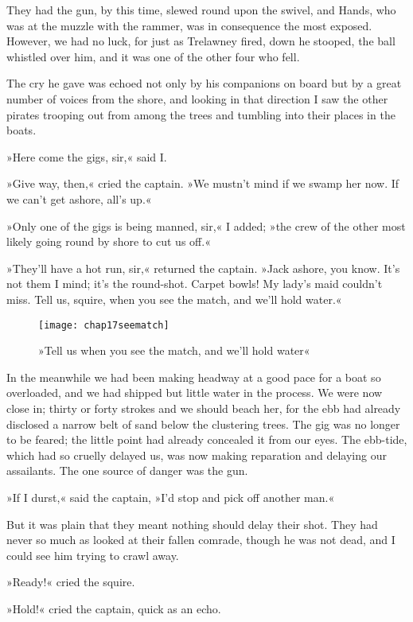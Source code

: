 They had the gun, by this time, slewed round upon the swivel, and Hands, who was at the muzzle with the rammer, was in consequence the most exposed. However, we had no luck, for just as Trelawney fired, down he stooped, the ball whistled over him, and it was one of the other four who fell.

The cry he gave was echoed not only by his companions on board but by a great number of voices from the shore, and looking in that direction I saw the other pirates trooping out from among the trees and tumbling into their places in the boats.

»Here come the gigs, sir,« said I.

»Give way, then,« cried the captain. »We mustn't mind if we swamp her now. If we can't get ashore, all's up.«

»Only one of the gigs is being manned, sir,« I added; »the crew of the other most likely going round by shore to cut us off.«

»They'll have a hot run, sir,« returned the captain. »Jack ashore, you know. It's not them I mind; it's the round-shot. Carpet bowls! My lady's maid couldn't miss. Tell us, squire, when you see the match, and we'll hold water.«


  \begin{figure}[p]
\centering
\texttt{[image: chap17seematch]}
\caption{»Tell us when you see the match, and we'll hold water«}
\end{figure} 

In the meanwhile we had been making headway at a good pace for a boat so overloaded, and we had shipped but little water in the process. We were now close in; thirty or forty strokes and we should beach her, for the ebb had already disclosed a narrow belt of sand below the clustering trees. The gig was no longer to be feared; the little point had already concealed it from our eyes. The ebb-tide, which had so cruelly delayed us, was now making reparation and delaying our assailants. The one source of danger was the gun.

»If I durst,« said the captain, »I'd stop and pick off another man.«

But it was plain that they meant nothing should delay their shot. They had never so much as looked at their fallen comrade, though he was not dead, and I could see him trying to crawl away.

»Ready!« cried the squire.

»Hold!« cried the captain, quick as an echo.

